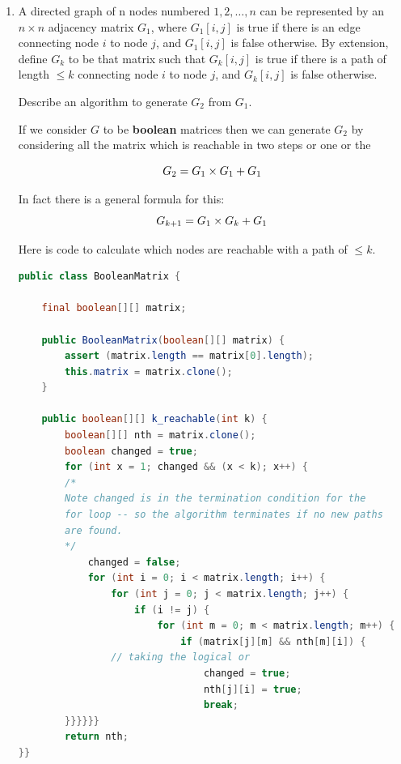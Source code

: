 \documentclass[10pt,\jkfside,a4paper]{article}
\begin{document}
\begin{enumerate}

\item A directed graph of n nodes numbered $1, 2, \dots , n$ can be represented by an $n \times n$ 
adjacency matrix $G_1$, where $G_1[i,j]$ is true if there is an edge connecting node $i$ to node $j$, 
and $G_1[i, j]$ is false otherwise.
By extension, define $G_k$ to be that matrix such that $G_k[i, j]$ is true if there is a path of length 
$\leq k$ connecting node $i$ to node $j$, and $G_k[i, j]$ is false otherwise.

Describe an algorithm to generate $G_2$ from $G_1$.

If we consider $G$ to be \textbf{boolean} matrices then we can generate $G_2$ by considering all the 
matrix which is reachable in two steps or one or the 

\begin{equation}
G_2 = G_1 \times G_1 + G_1 \\
\end{equation}

In fact there is a general formula for this:
\begin{equation}
G_{k + 1} = G_1 \times G_k + G_1 \\
\end{equation}

Here is code to calculate which nodes are reachable with a path of $\leq k$.

\begin{lstlisting}[language=java]
public class BooleanMatrix {

    final boolean[][] matrix;

    public BooleanMatrix(boolean[][] matrix) {
        assert (matrix.length == matrix[0].length);
        this.matrix = matrix.clone();
    }

    public boolean[][] k_reachable(int k) {
        boolean[][] nth = matrix.clone();
        boolean changed = true;
        for (int x = 1; changed && (x < k); x++) {
	    /*
	    Note changed is in the termination condition for the 
	    for loop -- so the algorithm terminates if no new paths 
	    are found.
	    */
            changed = false;
            for (int i = 0; i < matrix.length; i++) {
                for (int j = 0; j < matrix.length; j++) {
                    if (i != j) {
                        for (int m = 0; m < matrix.length; m++) {
                            if (matrix[j][m] && nth[m][i]) {
			    // taking the logical or
                                changed = true;
                                nth[j][i] = true;
                                break;
        }}}}}}
        return nth;
}}
\end{lstlisting}


\end{enumerate}
\end{document}
